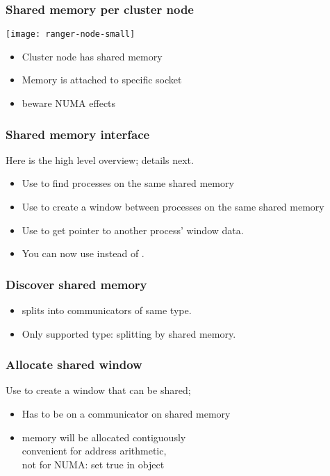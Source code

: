 \begin{frame}[containsverbatim]\frametitle{Shared memory per cluster node}
  \texttt{[image: ranger-node-small]}
  \begin{itemize}
  \item Cluster node has shared memory
  \item Memory is attached to specific socket
  \item beware \ac{NUMA} effects
  \end{itemize}
\end{frame}

\begin{frame}[containsverbatim]\frametitle{Shared memory interface}
  Here is the high level overview; details next.
  \begin{itemize}
  \item Use  to find processes on the same
    shared memory
  \item Use  to create a window between
    processes on the same shared memory
  \item Use  to get pointer to another
    process' window data.
  \item You can now use  instead of .
  \end{itemize}
\end{frame}

\begin{frame}[containsverbatim]\frametitle{Discover shared memory}
  \begin{itemize}
  \item
     splits into communicators of same type.
  \item Only supported type:  splitting by
    shared memory.
  \end{itemize}

\end{frame}

\begin{frame}[containsverbatim]\frametitle{Allocate shared window}
Use  to create a window that can
be shared;
\begin{itemize}
\item Has to be on a communicator on shared memory
\item memory will be allocated contiguously\\
  convenient for address arithmetic,\\ not for NUMA:
  set  true in
   object
\end{itemize}
\end{frame}

